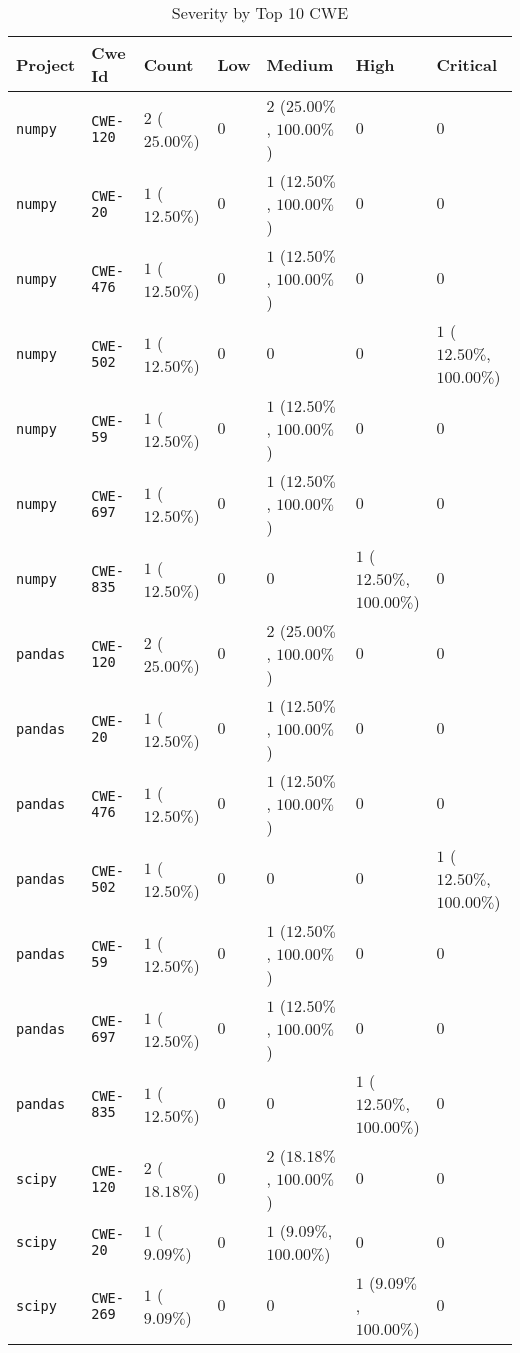 \begin{table}
\caption{Severity by Top 10 CWE}
\label{tab:cwe-distribution}
\begin{tabular}{lllllll}
\toprule
Project & Cwe Id & Count & Low & Medium & High & Critical \\
\midrule
\texttt{numpy} & \texttt{CWE-120} & $2$ ($25.00\%$) & $0$ & $2$ ($25.00\%$, $100.00\%$) & $0$ & $0$ \\
\texttt{numpy} & \texttt{CWE-20} & $1$ ($12.50\%$) & $0$ & $1$ ($12.50\%$, $100.00\%$) & $0$ & $0$ \\
\texttt{numpy} & \texttt{CWE-476} & $1$ ($12.50\%$) & $0$ & $1$ ($12.50\%$, $100.00\%$) & $0$ & $0$ \\
\texttt{numpy} & \texttt{CWE-502} & $1$ ($12.50\%$) & $0$ & $0$ & $0$ & $1$ ($12.50\%$, $100.00\%$) \\
\texttt{numpy} & \texttt{CWE-59} & $1$ ($12.50\%$) & $0$ & $1$ ($12.50\%$, $100.00\%$) & $0$ & $0$ \\
\texttt{numpy} & \texttt{CWE-697} & $1$ ($12.50\%$) & $0$ & $1$ ($12.50\%$, $100.00\%$) & $0$ & $0$ \\
\texttt{numpy} & \texttt{CWE-835} & $1$ ($12.50\%$) & $0$ & $0$ & $1$ ($12.50\%$, $100.00\%$) & $0$ \\
\texttt{pandas} & \texttt{CWE-120} & $2$ ($25.00\%$) & $0$ & $2$ ($25.00\%$, $100.00\%$) & $0$ & $0$ \\
\texttt{pandas} & \texttt{CWE-20} & $1$ ($12.50\%$) & $0$ & $1$ ($12.50\%$, $100.00\%$) & $0$ & $0$ \\
\texttt{pandas} & \texttt{CWE-476} & $1$ ($12.50\%$) & $0$ & $1$ ($12.50\%$, $100.00\%$) & $0$ & $0$ \\
\texttt{pandas} & \texttt{CWE-502} & $1$ ($12.50\%$) & $0$ & $0$ & $0$ & $1$ ($12.50\%$, $100.00\%$) \\
\texttt{pandas} & \texttt{CWE-59} & $1$ ($12.50\%$) & $0$ & $1$ ($12.50\%$, $100.00\%$) & $0$ & $0$ \\
\texttt{pandas} & \texttt{CWE-697} & $1$ ($12.50\%$) & $0$ & $1$ ($12.50\%$, $100.00\%$) & $0$ & $0$ \\
\texttt{pandas} & \texttt{CWE-835} & $1$ ($12.50\%$) & $0$ & $0$ & $1$ ($12.50\%$, $100.00\%$) & $0$ \\
\texttt{scipy} & \texttt{CWE-120} & $2$ ($18.18\%$) & $0$ & $2$ ($18.18\%$, $100.00\%$) & $0$ & $0$ \\
\texttt{scipy} & \texttt{CWE-20} & $1$ ($9.09\%$) & $0$ & $1$ ($9.09\%$, $100.00\%$) & $0$ & $0$ \\
\texttt{scipy} & \texttt{CWE-269} & $1$ ($9.09\%$) & $0$ & $0$ & $1$ ($9.09\%$, $100.00\%$) & $0$ \\

\end{tabular}
\end{table}
